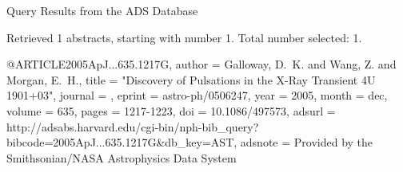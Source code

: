 Query Results from the ADS Database


Retrieved 1 abstracts, starting with number 1.  Total number selected: 1.

@ARTICLE{2005ApJ...635.1217G,
   author = {{Galloway}, D.~K. and {Wang}, Z. and {Morgan}, E.~H.},
    title = "{Discovery of Pulsations in the X-Ray Transient 4U 1901+03}",
  journal = {\apj},
   eprint = {astro-ph/0506247},
     year = 2005,
    month = dec,
   volume = 635,
    pages = {1217-1223},
      doi = {10.1086/497573},
   adsurl = {http://adsabs.harvard.edu/cgi-bin/nph-bib_query?bibcode=2005ApJ...635.1217G&db_key=AST},
  adsnote = {Provided by the Smithsonian/NASA Astrophysics Data System}
}


